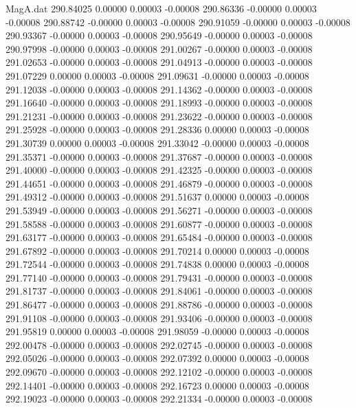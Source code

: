 \begin{filecontents}{MagA.dat}
 290.84025    0.00000    0.00003   -0.00008
 290.86336   -0.00000    0.00003   -0.00008
 290.88742   -0.00000    0.00003   -0.00008
 290.91059   -0.00000    0.00003   -0.00008
 290.93367   -0.00000    0.00003   -0.00008
 290.95649   -0.00000    0.00003   -0.00008
 290.97998   -0.00000    0.00003   -0.00008
 291.00267   -0.00000    0.00003   -0.00008
 291.02653   -0.00000    0.00003   -0.00008
 291.04913   -0.00000    0.00003   -0.00008
 291.07229    0.00000    0.00003   -0.00008
 291.09631   -0.00000    0.00003   -0.00008
 291.12038   -0.00000    0.00003   -0.00008
 291.14362   -0.00000    0.00003   -0.00008
 291.16640   -0.00000    0.00003   -0.00008
 291.18993   -0.00000    0.00003   -0.00008
 291.21231   -0.00000    0.00003   -0.00008
 291.23622   -0.00000    0.00003   -0.00008
 291.25928   -0.00000    0.00003   -0.00008
 291.28336    0.00000    0.00003   -0.00008
 291.30739    0.00000    0.00003   -0.00008
 291.33042   -0.00000    0.00003   -0.00008
 291.35371   -0.00000    0.00003   -0.00008
 291.37687   -0.00000    0.00003   -0.00008
 291.40000   -0.00000    0.00003   -0.00008
 291.42325   -0.00000    0.00003   -0.00008
 291.44651   -0.00000    0.00003   -0.00008
 291.46879   -0.00000    0.00003   -0.00008
 291.49312   -0.00000    0.00003   -0.00008
 291.51637    0.00000    0.00003   -0.00008
 291.53949   -0.00000    0.00003   -0.00008
 291.56271   -0.00000    0.00003   -0.00008
 291.58588   -0.00000    0.00003   -0.00008
 291.60877   -0.00000    0.00003   -0.00008
 291.63177   -0.00000    0.00003   -0.00008
 291.65484   -0.00000    0.00003   -0.00008
 291.67892   -0.00000    0.00003   -0.00008
 291.70214    0.00000    0.00003   -0.00008
 291.72544   -0.00000    0.00003   -0.00008
 291.74838    0.00000    0.00003   -0.00008
 291.77140   -0.00000    0.00003   -0.00008
 291.79431   -0.00000    0.00003   -0.00008
 291.81737   -0.00000    0.00003   -0.00008
 291.84061   -0.00000    0.00003   -0.00008
 291.86477   -0.00000    0.00003   -0.00008
 291.88786   -0.00000    0.00003   -0.00008
 291.91108   -0.00000    0.00003   -0.00008
 291.93406   -0.00000    0.00003   -0.00008
 291.95819    0.00000    0.00003   -0.00008
 291.98059   -0.00000    0.00003   -0.00008
 292.00478   -0.00000    0.00003   -0.00008
 292.02745   -0.00000    0.00003   -0.00008
 292.05026   -0.00000    0.00003   -0.00008
 292.07392    0.00000    0.00003   -0.00008
 292.09670   -0.00000    0.00003   -0.00008
 292.12102   -0.00000    0.00003   -0.00008
 292.14401   -0.00000    0.00003   -0.00008
 292.16723    0.00000    0.00003   -0.00008
 292.19023   -0.00000    0.00003   -0.00008
 292.21334   -0.00000    0.00003   -0.00008

\end{filecontents}
